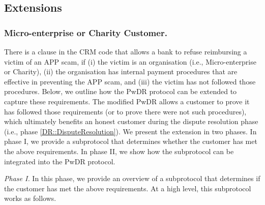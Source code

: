 

\subsection{Extensions}

\subsubsection{Micro-enterprise or Charity Customer.} There is a clause in the CRM code that  allows a bank to refuse reimbursing a victim of an APP scam, if (i) the victim is an organisation (i.e., Micro-enterprise or Charity), (ii) the organisation has internal payment procedures that are effective in preventing the APP scam, and (iii) the victim has not followed those procedures. Below, we outline how the PwDR protocol can be extended to capture these requirements. The modified PwDR allows a customer to prove it has followed those requirements (or to prove there were not such  procedures), which ultimately benefits an honest customer during the dispute resolution phase (i.e., phase \ref{DR::DisputeResolution}).   We present the extension in two phases. In phase I, we provide a subprotocol that determines whether the customer has met the above requirements. In phase II, we show how the subprotocol can be integrated into the PwDR protocol.  

\noindent\textit{{Phase I.}} In this phase, we provide an overview of a  subprotocol that determines if the customer has met the above requirements. At a high level, this subprotocol works as follows.


